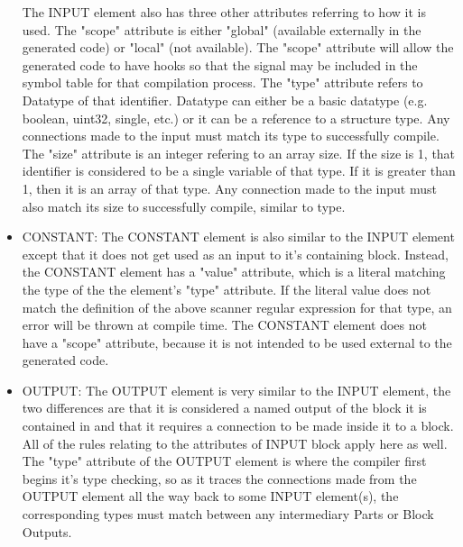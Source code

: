 \begin{itemize}[label={}]
The INPUT element also has three other attributes referring to how it is used.
The "scope" attribute is either "global" (available externally in the generated code) or "local" (not available).
The "scope" attribute will allow the generated code to have hooks so that the signal may be included in the symbol table for that compilation process.
The "type" attribute refers to Datatype of that identifier.
Datatype can either be a basic datatype (e.g. boolean, uint32, single, etc.) or it can be a reference to a structure type.
Any connections made to the input must match its type to successfully compile.
The "size" attribute is an integer refering to an array size.
If the size is 1, that identifier is considered to be a single variable of that type.
If it is greater than 1, then it is an array of that type.
Any connection made to the input must also match its size to successfully compile, similar to type.
    \item CONSTANT:
The CONSTANT element is also similar to the INPUT element except that it does not get used as an input to it's containing block.
Instead, the CONSTANT element has a "value" attribute, which is a literal matching the type of the the element's "type" attribute.
If the literal value does not match the definition of the above scanner regular expression for that type, an error will be thrown at compile time.
The CONSTANT element does not have a "scope" attribute, because it is not intended to be used external to the generated code.
    \item OUTPUT:
The OUTPUT element is very similar to the INPUT element, the two differences are that it is considered a named output of the block it is contained in and that it requires a connection to be made inside it to a block.
All of the rules relating to the attributes of INPUT block apply here as well.
The "type" attribute of the OUTPUT element is where the compiler first begins it's type checking, so as it traces the connections made from the OUTPUT element all the way back to some INPUT element(s), the corresponding types must match between any intermediary Parts or Block Outputs.
\end{itemize}
